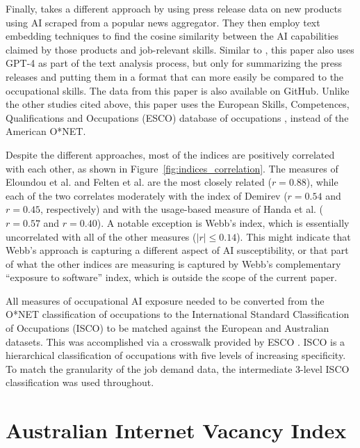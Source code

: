 \documentclass[11pt]{article}
\begin{document}
Finally, \citet{demirev2024assessing} takes a different approach by using press release data on new products using AI scraped from a popular news aggregator. They then employ text embedding techniques to find the cosine similarity between the AI capabilities claimed by those products and job-relevant skills. Similar to \citet{eloundou_gpts_2023}, this paper also uses GPT-4 as part of the text analysis process, but only for summarizing the press releases and putting them in a format that can more easily be compared to the occupational skills. The data from this paper is also available on GitHub. Unlike the other studies cited above, this paper uses the European Skills, Competences, Qualifications and Occupations (ESCO) database of occupations \cite{esco_handbook}, instead of the American O*NET.

Despite the different approaches, most of the indices are positively correlated with each other, as shown in Figure~\ref{fig:indices_correlation}. The measures of Eloundou et al. and Felten et al. are the most closely related ($r=0.88$), while each of the two correlates moderately with the index of Demirev ($r=0.54$ and $r=0.45$, respectively) and with the usage-based measure of Handa et al. ($r=0.57$ and $r=0.40$). A notable exception is Webb's index, which is essentially uncorrelated with all of the other measures ($|r| \le 0.14$). This might indicate that Webb's approach is capturing a different aspect of AI susceptibility, or that part of what the other indices are measuring is captured by Webb's complementary ``exposure to software'' index, which is outside the scope of the current paper.

All measures of occupational AI exposure needed to be converted from the O*NET classification of occupations to the International Standard Classification of Occupations (ISCO) \citep{ilo2012isco} to be matched against the European and Australian datasets. This was accomplished via a crosswalk provided by ESCO \citep{esco_handbook}. ISCO is a hierarchical classification of occupations with five levels of increasing specificity. To match the granularity of the job demand data, the intermediate 3-level ISCO classification was used throughout.


\section{Australian Internet Vacancy Index}
\label{sec:aus_appendix}
\end{document}
